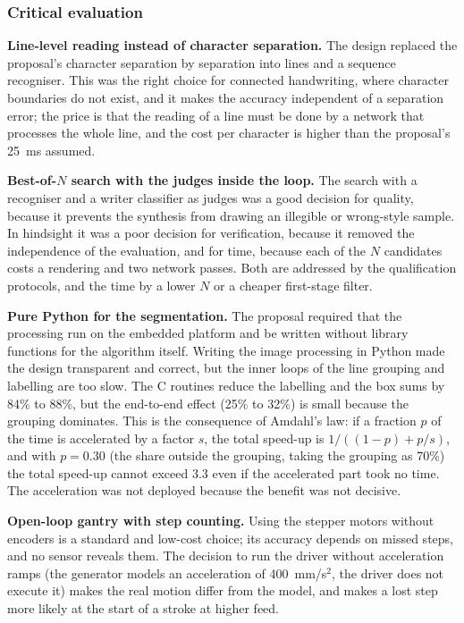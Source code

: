     \subsubsection{Critical evaluation}
    \label{sec:dis-crit}

        \textbf{Line-level reading instead of character separation.}
        The design replaced the proposal's character separation by separation into lines and a sequence recogniser.
        This was the right choice for connected handwriting, where character boundaries do not exist, and it makes the accuracy independent of a separation error; the price is that the reading of a line must be done by a network that processes the whole line, and the cost per character is higher than the proposal's 25~ms assumed.

        \textbf{Best-of-$N$ search with the judges inside the loop.}
        The search with a recogniser and a writer classifier as judges was a good decision for quality, because it prevents the synthesis from drawing an illegible or wrong-style sample.
        In hindsight it was a poor decision for verification, because it removed the independence of the evaluation, and for time, because each of the $N$ candidates costs a rendering and two network passes.
        Both are addressed by the qualification protocols, and the time by a lower $N$ or a cheaper first-stage filter.

        \textbf{Pure Python for the segmentation.}
        The proposal required that the processing run on the embedded platform and be written without library functions for the algorithm itself.
        Writing the image processing in Python made the design transparent and correct, but the inner loops of the line grouping and labelling are too slow.
        The C routines reduce the labelling and the box sums by 84\% to 88\%, but the end-to-end effect (25\% to 32\%) is small because the grouping dominates.
        This is the consequence of Amdahl's law: if a fraction $p$ of the time is accelerated by a factor $s$, the total speed-up is $1/((1-p)+p/s)$, and with $p=0.30$ (the share outside the grouping, taking the grouping as 70\%) the total speed-up cannot exceed $3.3$ even if the accelerated part took no time.
        The acceleration was not deployed because the benefit was not decisive.

        \textbf{Open-loop gantry with step counting.}
        Using the stepper motors without encoders is a standard and low-cost choice; its accuracy depends on missed steps, and no sensor reveals them.
        The decision to run the driver without acceleration ramps (the generator models an acceleration of 400~mm/s$^2$, the driver does not execute it) makes the real motion differ from the model, and makes a lost step more likely at the start of a stroke at higher feed.


